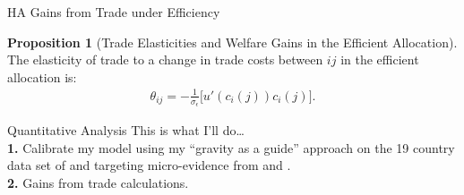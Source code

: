 \documentclass[9pt,pdftex,aspectratio=1610]{beamer}
\theoremstyle{definition}
\newtheorem{prp}{Proposition}
\begin{document}

\begin{frame}[t]{HA Gains from Trade under Efficiency}
\vspace{-.25cm}
\smallskip
{\small
\begin{prp}[{\normalsize Trade Elasticities and Welfare Gains in the Efficient Allocation}]\label{prp:gains-efficient-allocation} The elasticity of trade to a change in trade costs between $ij$ in the efficient allocation is:
\begin{align*}
\theta_{ij} =  -\frac{1}{\sigma_{\epsilon}} \bigg [ u'(c_{i}(j)) c_{i}(j) \bigg]. 
\end{align*}
 
\end{prp}
}
\medskip
{}


\end{frame}


\begin{frame}[t]{Quantitative Analysis}
\smallskip
\smallskip
This is what I'll do\ldots\\
\bigskip
\textbf{1.} Calibrate my model using my ``gravity as a guide'' approach on the 19 country data set of \citet{eaton2002technology} and targeting micro-evidence from \citet{borusyak2021distributional} and \citet{auer2022unequal}. \\
\bigskip
\textbf{2.} Gains from trade calculations.\\
\end{frame}
\end{document}

